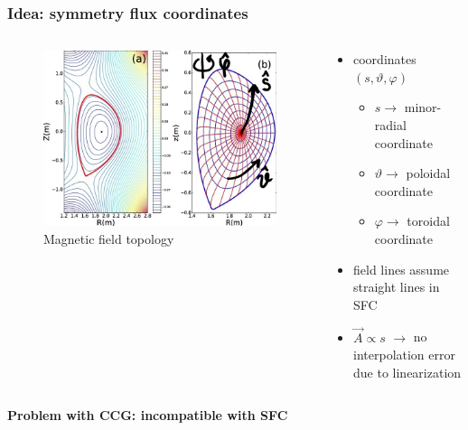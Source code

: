 \documentclass{beamer}
\begin{document}
\begin{frame}[noframenumbering]
\frametitle{Idea: symmetry flux coordinates}
\vspace{-1 cm}
\begin{columns}[onlytextwidth]
	\begin{column}{0.5\textwidth}
		\begin{center}
			\begin{figure}
				\includegraphics[trim={0 0cm 0 0cm},clip,width=1\textwidth]{FIGURES/magnetic_field_labeled0.jpg}
				\caption{Magnetic field topology}
			\end{figure}
		\end{center}
	\end{column}
	\begin{column}{0.5\textwidth}
		\vspace{0 cm}
		\begin{center}
			\begin{itemize}
				\item coordinates $(s,\vartheta,\varphi)$\\
				\begin{itemize}
					\item $s\rightarrow$ minor-radial coordinate
					\item $\vartheta \rightarrow$ poloidal coordinate
					\item $\varphi \rightarrow$ toroidal coordinate
				\end{itemize}
				\item field lines assume straight lines in SFC
				\item $\vec{A}\propto s$
				$\rightarrow$ no interpolation error due to linearization
			\end{itemize}
		\end{center}
	\end{column}
\end{columns}
\vspace{0.4 cm}
\textbf{Problem with CCG: incompatible with SFC}
\end{frame}
\end{document}
